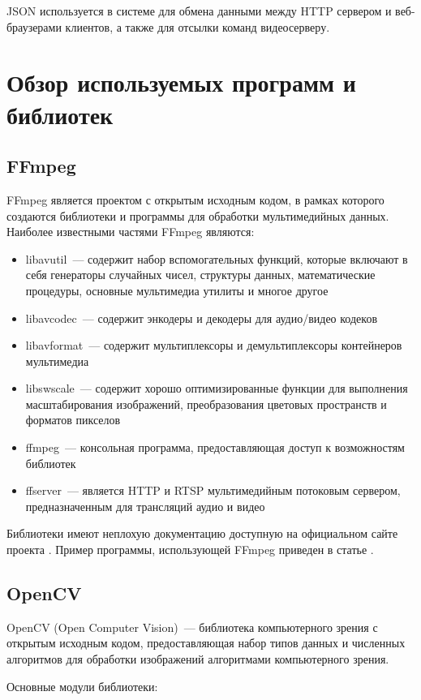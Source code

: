 JSON используется в системе для обмена данными между HTTP сервером и веб-браузерами клиентов,
а также для отсылки команд видеосерверу.

\section{Обзор используемых программ и библиотек}

\subsection{FFmpeg}
FFmpeg \cite{ffmpeg_about} является проектом с открытым исходным кодом, в рамках которого создаются библиотеки и
программы для обработки мультимедийных данных.
Наиболее известными частями FFmpeg являются:
\smallskip
\begin{itemize}
	\item
	libavutil~--- содержит набор вспомогательных функций, которые включают в себя генераторы
	случайных чисел, структуры данных, математические процедуры, основные мультимедиа утилиты
	и многое другое
	\item
	libavcodec~--- содержит энкодеры и декодеры для аудио/видео кодеков
	\item
	libavformat~--- содержит мультиплексоры и демультиплексоры контейнеров мультимедиа
	\item
	libswscale~--- содержит хорошо оптимизированные функции для выполнения масштабирования
	изображений, преобразования цветовых пространств и форматов пикселов
	\item
	ffmpeg~--- консольная программа, предоставляющая доступ к возможностям библиотек
	\item
	ffserver~--- является HTTP и RTSP мультимедийным потоковым сервером, предназначенным
	для трансляций аудио и видео
\end{itemize}
Библиотеки имеют неплохую документацию доступную на официальном сайте проекта \cite{ffmpeg_doc}.
Пример программы, использующей FFmpeg приведен в статье \cite{ffmpeg_example}.

\subsection{OpenCV}
OpenCV (Open Computer Vision)~--- библиотека компьютерного зрения с открытым исходным кодом,
предоставляющая набор типов данных и численных алгоритмов для обработки изображений алгоритмами
компьютерного зрения.

\medskip
Основные модули библиотеки:
\smallskip

